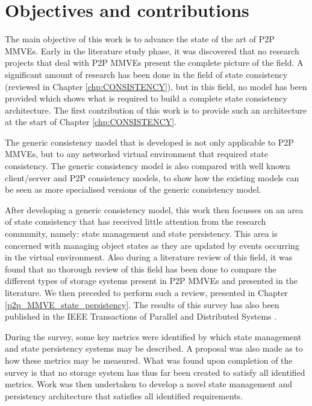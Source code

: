 \section{Objectives and contributions}
\label{objectives}

The main objective of this work is to advance the state of the art of P2P MMVEs. Early in the literature study phase, it was discovered that no research projects that deal with P2P MMVEs present the complete picture of the field. A significant amount of research has been done in the field of state consistency (reviewed in Chapter \ref{chp:CONSISTENCY}), but in this field, no model has been provided which shows what is required to build a complete state consistency architecture. The first contribution of this work is to provide such an architecture at the start of Chapter \ref{chp:CONSISTENCY}.

The generic consistency model that is developed is not only applicable to P2P MMVEs, but to any networked virtual environment that required state consistency. The generic consistency model is also compared with well known client/server and P2P consistency models, to show how the existing models can be seen as more specialised versions of the generic consistency model.

After developing a generic consistency model, this work then focusses on an area of state consistency that has received little attention from the research community, namely: state management and state persistency. This area is concerned with managing object states as they are updated by events occurring in the virtual environment. Also during a literature review of this field, it was found that no thorough review of this field has been done to compare the different types of storage systems present in P2P MMVEs and presented in the literature. We then preceded to perform such a review, presented in Chapter \ref{p2p_MMVE_state_persistency}. The results of this survey has also been published in the IEEE Transactions of Parallel and Distributed Systems \cite{gilmore_p2p_mmog_state_persistency}.

During the survey, some key metrics were identified by which state management and state persistency systems may be described. A proposal was also made as to how these metrics may be measured. What was found upon completion of the survey is that no storage system has thus far been created to satisfy all identified metrics. Work was then undertaken to develop a novel state management and persistency architecture that satisfies all identified requirements.

